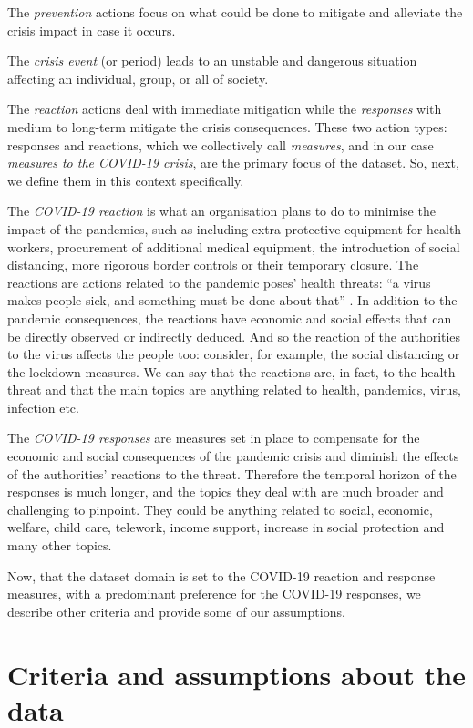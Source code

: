 The \textit{prevention} actions focus on what could be done to mitigate and alleviate the crisis impact in case it occurs. 

The \textit{crisis event} (or period) leads to an unstable and dangerous situation affecting an individual, group, or all of society. 

The \textit{reaction} actions deal with immediate mitigation while the \textit{responses} with medium to long-term mitigate the crisis consequences. These two action types: responses and reactions, which we collectively call \textit{measures}, and in our case \textit{measures to the COVID-19 crisis}, are the primary focus of the dataset. So, next, we define them in this context specifically. 

The \textit{COVID-19 reaction} is what an organisation plans to do to minimise the impact of the pandemics, such as including extra protective equipment for health workers, procurement of additional medical equipment, the introduction of social distancing, more rigorous border controls or their temporary closure. The reactions are actions related to the pandemic poses' health threats: ``a virus makes people sick, and something must be done about that'' . In addition to the pandemic consequences, the reactions have economic and social effects that can be directly observed or indirectly deduced. And so the reaction of the authorities to the virus affects the people too: consider, for example, the social distancing or the lockdown measures. We can say that the reactions are, in fact, to the health threat and that the main topics are anything related to health, pandemics, virus, infection etc. 

The \textit{COVID-19 responses} are measures set in place to compensate for the economic and social consequences of the pandemic crisis and diminish the effects of the authorities' reactions to the threat. Therefore the temporal horizon of the responses is much longer, and the topics they deal with are much broader and challenging to pinpoint. They could be anything related to social, economic, welfare, child care, telework, income support, increase in social protection and many other topics. 

Now, that the dataset domain is set to the COVID-19 reaction and response measures, with a predominant preference for the COVID-19 responses, we describe other criteria and provide some of our assumptions.  

\section{Criteria and assumptions about the data}
\label{sec:criteria}


